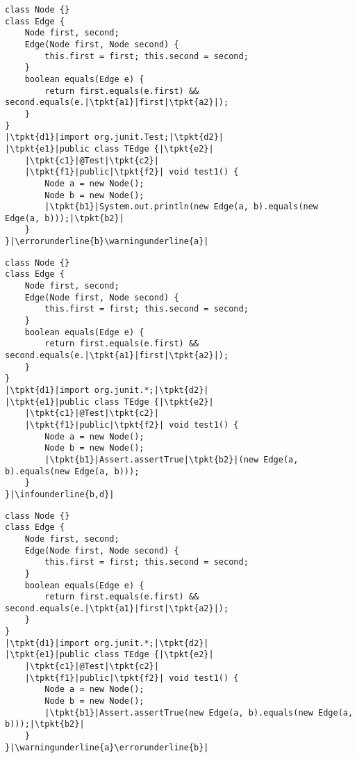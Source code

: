 \newsavebox{\bugthree}
\begin{lrbox}{\bugthree}
\begin{lstlisting}
class Node {}
class Edge {
	Node first, second;
	Edge(Node first, Node second) {
		this.first = first; this.second = second;
	}
	boolean equals(Edge e) {
		return first.equals(e.first) && second.equals(e.|\tpkt{a1}|first|\tpkt{a2}|);
	}
}
|\tpkt{d1}|import org.junit.Test;|\tpkt{d2}|
|\tpkt{e1}|public class TEdge {|\tpkt{e2}|
	|\tpkt{c1}|@Test|\tpkt{c2}|
	|\tpkt{f1}|public|\tpkt{f2}| void test1() {
		Node a = new Node();
		Node b = new Node();
		|\tpkt{b1}|System.out.println(new Edge(a, b).equals(new Edge(a, b)));|\tpkt{b2}|
	}
}|\errorunderline{b}\warningunderline{a}|
\end{lstlisting}
\end{lrbox}

\newsavebox{\codefour}
\begin{lrbox}{\codefour}
\begin{lstlisting}
class Node {}
class Edge {
	Node first, second;
	Edge(Node first, Node second) {
		this.first = first; this.second = second;
	}
	boolean equals(Edge e) {
	    return first.equals(e.first) && second.equals(e.|\tpkt{a1}|first|\tpkt{a2}|);
	}
}
|\tpkt{d1}|import org.junit.*;|\tpkt{d2}|
|\tpkt{e1}|public class TEdge {|\tpkt{e2}|
	|\tpkt{c1}|@Test|\tpkt{c2}|
	|\tpkt{f1}|public|\tpkt{f2}| void test1() {
		Node a = new Node();
		Node b = new Node();
		|\tpkt{b1}|Assert.assertTrue|\tpkt{b2}|(new Edge(a, b).equals(new Edge(a, b)));
	}
}|\infounderline{b,d}|
\end{lstlisting}
\end{lrbox}

\newsavebox{\bugfour}
\begin{lrbox}{\bugfour}
	\begin{lstlisting}
class Node {}
class Edge {
	Node first, second;
	Edge(Node first, Node second) {
		this.first = first; this.second = second;
	}
	boolean equals(Edge e) {
		return first.equals(e.first) && second.equals(e.|\tpkt{a1}|first|\tpkt{a2}|);
	}
}
|\tpkt{d1}|import org.junit.*;|\tpkt{d2}|
|\tpkt{e1}|public class TEdge {|\tpkt{e2}|
	|\tpkt{c1}|@Test|\tpkt{c2}|
	|\tpkt{f1}|public|\tpkt{f2}| void test1() {
		Node a = new Node();
		Node b = new Node();
		|\tpkt{b1}|Assert.assertTrue(new Edge(a, b).equals(new Edge(a, b)));|\tpkt{b2}|
	}
}|\warningunderline{a}\errorunderline{b}|
	\end{lstlisting}
\end{lrbox}

